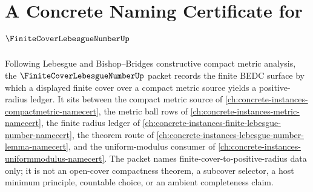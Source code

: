 \chapter{A Concrete Naming Certificate for $\FiniteCoverLebesgueNumberUp$}
\label{ch:concrete-instances-finite-cover-lebesgue-number-namecert}

Following Lebesgue and Bishop--Bridges constructive compact metric analysis, the $\FiniteCoverLebesgueNumberUp$ packet records the finite BEDC surface by which a displayed finite cover over a compact metric source yields a positive-radius ledger. It sits between the compact metric source of \autoref{ch:concrete-instances-compactmetric-namecert}, the metric ball rows of \autoref{ch:concrete-instances-metric-namecert}, the finite radius ledger of \autoref{ch:concrete-instances-finite-lebesgue-number-namecert}, the theorem route of \autoref{ch:concrete-instances-lebesgue-number-lemma-namecert}, and the uniform-modulus consumer of \autoref{ch:concrete-instances-uniformmodulus-namecert}. The packet names finite-cover-to-positive-radius data only; it is not an open-cover compactness theorem, a subcover selector, a host minimum principle, countable choice, or an ambient completeness claim.

